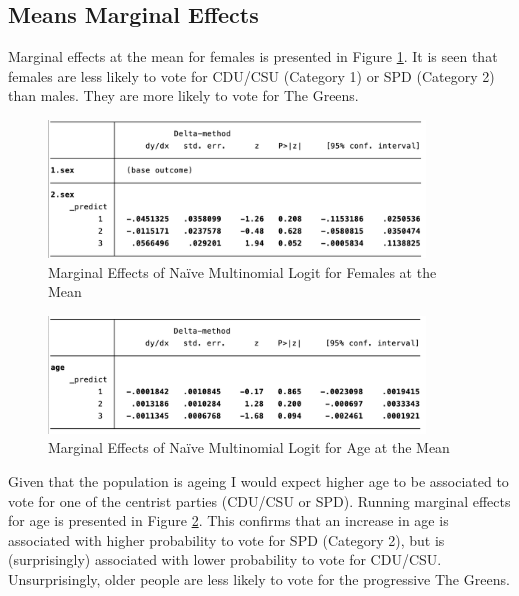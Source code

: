     \subsection{Means Marginal Effects}
        Marginal effects at the mean for females is presented in Figure \ref{fig_22_female}. It is seen that females are less likely to vote for CDU/CSU (Category 1) or SPD (Category 2) than males. They are more likely to vote for The Greens.
            \begin{figure}[!htb]
                \centering
                \includegraphics[width=10cm]{figs/22_female.png}
                \caption{Marginal Effects of Naïve Multinomial Logit for Females at the Mean}
                \label{fig_22_female}
            \end{figure}
            \begin{figure}[!htb]
                \centering
                \includegraphics[width=10cm]{figs/22_age.png}
                \caption{Marginal Effects of Naïve Multinomial Logit for Age at the Mean}
                \label{fig_22_age}
            \end{figure}
        \newline\indent
        Given that the population is ageing I would expect higher age to be associated to vote for one of the centrist parties (CDU/CSU or SPD). Running marginal effects for age is presented in Figure \ref{fig_22_age}. This confirms that an increase in age is associated with higher probability to vote for SPD (Category 2), but is (surprisingly) associated with lower probability to vote for CDU/CSU. Unsurprisingly, older people are less likely to vote for the progressive The Greens. 
    
